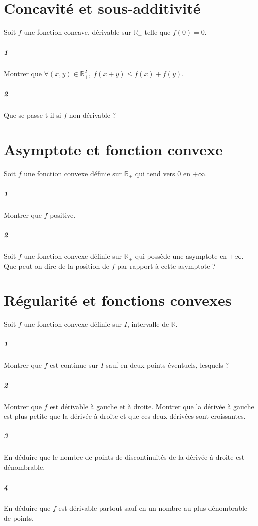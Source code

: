 \documentclass[10pt,a4paper]{article}
\begin{document}
\section{Concavité et sous-additivité}
Soit $f$ une fonction concave, dérivable sur $\mathbb{R}_+$ telle que $f(0)=0$.
\subparagraph{1}Montrer que $\forall (x,y) \in \mathbb{R}_+^2, \ f(x+y) \le f(x) + f(y)$.
\subparagraph{2}Que se passe-t-il si $f$ non dérivable ?

\section{Asymptote et fonction convexe}
Soit $f$ une fonction convexe définie sur $\mathbb{R}_+$ qui tend vers $0$ en $+\infty$.
\subparagraph{1}Montrer que $f$ positive.
\subparagraph{2}Soit $f$ une fonction convexe définie sur $\mathbb{R}_+$ qui possède une asymptote en $+\infty$. Que peut-on dire de la position de $f$ par rapport à cette asymptote ?

\section{Régularité et fonctions convexes}
Soit $f$ une fonction convexe définie sur $I$, intervalle de $\mathbb{R}$.
\subparagraph{1}Montrer que $f$ est continue sur $I$ sauf en deux points éventuels, lesquels ?
\subparagraph{2}Montrer que $f$ est dérivable à gauche et à droite. Montrer que la dérivée à gauche est plus petite que la dérivée à droite et que ces deux dérivées sont croissantes.
\subparagraph{3}En déduire que le nombre de points de discontinuités de la dérivée à droite est dénombrable.
\subparagraph{4}En déduire que $f$ est dérivable partout sauf en un nombre au plus dénombrable de points.
\end{document}
